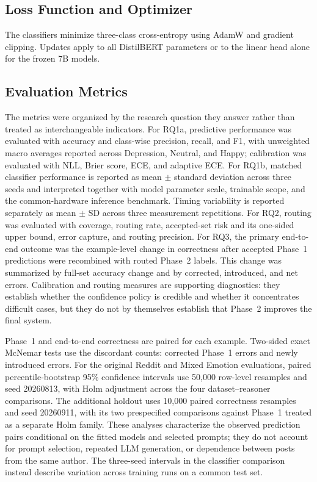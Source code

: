 \documentclass{ieeeaccess}
\begin{document}
\subsection{Loss Function and Optimizer}

The classifiers minimize three-class cross-entropy using AdamW and gradient clipping. Updates apply to all DistilBERT parameters or to the linear head alone for the frozen 7B models.

\subsection{Evaluation Metrics}

The metrics were organized by the research question they answer rather than treated as interchangeable indicators. For RQ1a, predictive performance was evaluated with accuracy and class-wise precision, recall, and F1, with unweighted macro averages reported across Depression, Neutral, and Happy; calibration was evaluated with NLL, Brier score, ECE, and adaptive ECE. For RQ1b, matched classifier performance is reported as mean $\pm$ standard deviation across three seeds and interpreted together with model parameter scale, trainable scope, and the common-hardware inference benchmark. Timing variability is reported separately as mean $\pm$ SD across three measurement repetitions. For RQ2, routing was evaluated with coverage, routing rate, accepted-set risk and its one-sided upper bound, error capture, and routing precision. For RQ3, the primary end-to-end outcome was the example-level change in correctness after accepted Phase~1 predictions were recombined with routed Phase~2 labels. This change was summarized by full-set accuracy change and by corrected, introduced, and net errors. Calibration and routing measures are supporting diagnostics: they establish whether the confidence policy is credible and whether it concentrates difficult cases, but they do not by themselves establish that Phase~2 improves the final system.

Phase~1 and end-to-end correctness are paired for each example. Two-sided exact McNemar tests use the discordant counts: corrected Phase~1 errors and newly introduced errors. For the original Reddit and Mixed Emotion evaluations, paired percentile-bootstrap 95\% confidence intervals use 50,000 row-level resamples and seed 20260813, with Holm adjustment across the four dataset--reasoner comparisons. The additional holdout uses 10,000 paired correctness resamples and seed 20260911, with its two prespecified comparisons against Phase~1 treated as a separate Holm family. These analyses characterize the observed prediction pairs conditional on the fitted models and selected prompts; they do not account for prompt selection, repeated LLM generation, or dependence between posts from the same author. The three-seed intervals in the classifier comparison instead describe variation across training runs on a common test set.
\end{document}
